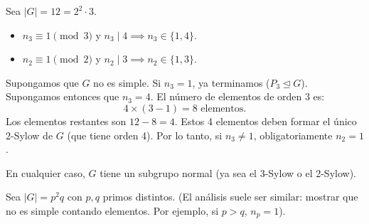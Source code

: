 \begin{eje}
    Sea $|G| = 12 = 2^2 \cdot 3$.
    \begin{itemize}
        \item $n_3 \equiv 1 \pmod 3$ y $n_3 \mid 4 \implies n_3 \in \{1, 4\}$.
        \item $n_2 \equiv 1 \pmod 2$ y $n_2 \mid 3 \implies n_2 \in \{1, 3\}$.
    \end{itemize}
    Supongamos que $G$ no es simple. Si $n_3 = 1$, ya terminamos ($P_3 \trianglelefteq G$).
    Supongamos entonces que $n_3 = 4$.
    El número de elementos de orden 3 es:
    \begin{equation*}
        4 \times (3-1) = 8 \text{ elementos.}
    \end{equation*}
    Los elementos restantes son $12 - 8 = 4$.
    Estos 4 elementos deben formar el único $2$-Sylow de $G$ (que tiene orden 4).
    Por lo tanto, si $n_3 \neq 1$, obligatoriamente $n_2 = 1$.
    
    En cualquier caso, $G$ tiene un subgrupo normal (ya sea el 3-Sylow o el 2-Sylow).
\end{eje}

\begin{eje}
    Sea $|G| = p^2 q$ con $p, q$ primos distintos.
    (El análisis suele ser similar: mostrar que no es simple contando elementos. Por ejemplo, si $p > q$, $n_p = 1$).
\end{eje}
